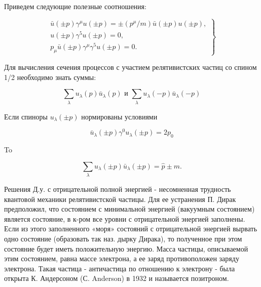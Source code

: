 \documentclass[10pt]{article}
\begin{document}
Приведем следующие полезные соотношения:



\[

\left.\begin{array}{c}

\bar{u}( \pm p) \gamma^{\mu} u( \pm p)= \pm\left(p^{\mu} / m\right) \bar{u}( \pm p) u( \pm p), \\

u( \pm p) \gamma^{5} u( \pm p)=0, \\

p_{\mu} \bar{u}( \pm p) \gamma^{\mu} \gamma^{5} u( \pm p)=0 .

\end{array}\right\}

\]



Для вычисления сечения процессов с участием релятивистских частиц со спином 1/2 необходимо знать суммы:



\[

\sum_{\lambda} u_{\lambda}(p) \bar{u}_{\lambda}(p) \text { и } \sum_{\lambda} u_{\lambda}(-p) \bar{u}_{\lambda}(-p)

\]



Если спиноры $u_{\lambda}( \pm p)$ нормированы условиями



\[

\bar{u}_{\lambda}( \pm p) \gamma^{0} u_{\lambda}( \pm p)=2 p_{0}

\]



To



\[

\sum_{\lambda} u_{\lambda}( \pm p) \bar{u}_{\lambda}( \pm p)=\hat{p} \pm m .

\]



Решения Д.у. с отрицательной полной энергией - несомненная трудность квантовой механики релятивистской частицы. Для ее устранения П. Дирак предположил, что состоянием с минимальной энергией (вакуумным состоянием) является состояние, в к-ром все уровни с отрицательной энергией заполнены. Если из этого заполненного «моря» состояний с отрицательной энергией вырвать одно состояние (образовать так наз. дырку Дирака), то полученное при этом состояние будет иметь положительную энергию. Масса частицы, описываемой этим состоянием, равна массе электрона, а ее заряд противоположен заряду электрона. Такая частица - античастица по отношению к электрону - была открыта К. Андерсоном (С. Anderson) в 1932 и называется позитроном.
\end{document}
